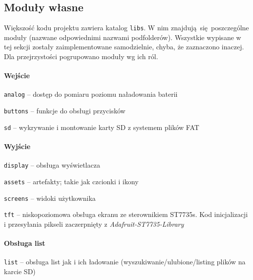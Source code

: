 \documentclass[polish]{aghengthesis}
\let\tempone\itemize
\let\temptwo\enditemize
\renewenvironment{itemize}{\tempone\setlength{\itemsep}{0cm}}{\temptwo}
\begin{document}
		\subsection{Moduły własne}
			Większość kodu projektu zawiera katalog \lstinline|libs|. W nim znajdują się poszczególne moduły (nazwane odpowiednimi nazwami podfolderów). Wszystkie wypisane w tej sekcji zostały zaimplementowane samodzielnie, chyba, że zaznaczono inaczej. Dla przejrzystości pogrupowano moduły wg ich ról.
		
			\paragraph{Wejście}
				\begin{itemize}
					\item \lstinline|analog| -- dostęp do pomiaru poziomu naładowania baterii
					\item \lstinline|buttons| -- funkcje do obsługi przycisków
					\item \lstinline|sd| -- wykrywanie i montowanie karty SD z systemem plików FAT
				\end{itemize}
		
			\paragraph{Wyjście}
				\begin{itemize}
					\item \lstinline|display| -- obsługa wyświetlacza
					\begin{itemize}
						\item \lstinline|assets| -- artefakty; takie jak czcionki i ikony
						\item \lstinline|screens| -- widoki użytkownika
						\item \lstinline|tft| -- niskopoziomowa obsługa ekranu ze sterownikiem ST7735s. Kod inicjalizacji i przesyłania pikseli zaczerpnięty z \textit{Adafruit-ST7735-Library}\textsuperscript{\cite{adafruit_st7735}}
					\end{itemize}
				\end{itemize}
			
			\paragraph{Obsługa list}
				\begin{itemize}
					\item \lstinline|list| -- obsługa list jak i ich ładowanie (wyszukiwanie/ulubione/listing plików na karcie SD)
				\end{itemize}
			
\end{document}
